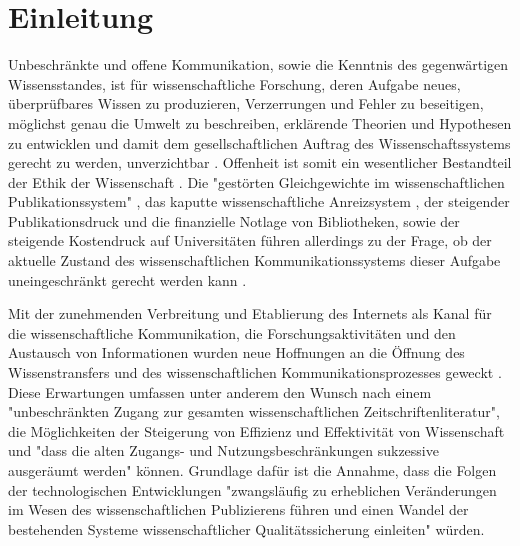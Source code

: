 \chapter{Einleitung}

Unbeschränkte und offene Kommunikation, sowie die Kenntnis des gegenwärtigen Wissensstandes, ist für wissenschaftliche Forschung, deren Aufgabe neues, überprüfbares Wissen zu produzieren, Verzerrungen und Fehler zu beseitigen, möglichst genau die Umwelt zu beschreiben, erklärende Theorien und Hypothesen zu entwicklen und damit dem gesellschaftlichen Auftrag des Wissenschaftssystems gerecht zu werden, unverzichtbar \cite{bbaw_publizieren_2015} \cite{Luescher_2014} \cite{Hanekop_2014} \cite{graefen2007_wissenschaftliche_artikel} \cite{glaeser2006} \cite{Luhmann1998} \cite{gibbons_1994}. Offenheit ist somit ein wesentlicher Bestandteil der Ethik der Wissenschaft \cite{Peters_2014} \cite{resnik_2005_ethics}. Die "gestörten Gleichgewichte im wissenschaftlichen Publikationssystem" \cite{cite:0}, das kaputte wissenschaftliche Anreizsystem \cite{Brembs_2013_a}, der steigender Publikationsdruck und die finanzielle Notlage von Bibliotheken, sowie der steigende Kostendruck auf Universitäten führen allerdings zu der Frage, ob der aktuelle Zustand des wissenschaftlichen Kommunikationssystems dieser Aufgabe uneingeschränkt gerecht werden kann \cite{Schekman_2013}.

Mit der zunehmenden Verbreitung und Etablierung des Internets als Kanal für die wissenschaftliche Kommunikation, die Forschungsaktivitäten und den Austausch von Informationen wurden neue Hoffnungen an die Öffnung des Wissenstransfers \cite{schulze_2013_open} \cite{albert_2006_open_implications} und des wissenschaftlichen Kommunikationsprozesses geweckt \cite{Hanekop_2014} \cite{EuropeanCommission_sciencepub_2006} \cite{Goodrum_2001} \cite{Lawrence_1999}. Diese Erwartungen umfassen unter anderem den Wunsch nach einem "unbeschränkten Zugang zur gesamten wissenschaftlichen Zeitschriftenliteratur", die Möglichkeiten der Steigerung von Effizienz und Effektivität von Wissenschaft und "dass die alten Zugangs- und Nutzungsbeschränkungen sukzessive ausgeräumt werden" \cite{boai_2002} können. Grundlage dafür ist die Annahme, dass die Folgen der technologischen Entwicklungen "zwangsläufig zu erheblichen Veränderungen im Wesen des wissenschaftlichen Publizierens führen und einen Wandel der bestehenden Systeme wissenschaftlicher Qualitätssicherung einleiten" \cite{berliner_erklaerung_2003} würden.


